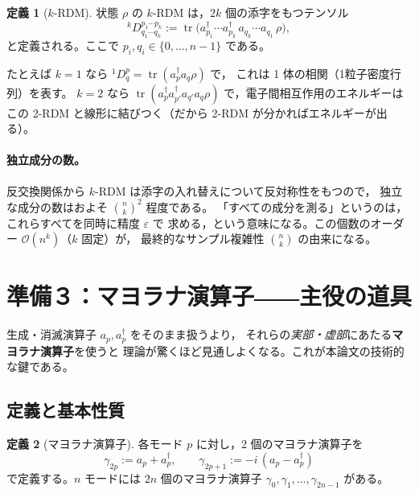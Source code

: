 \documentclass[11pt,a4paper]{ltjsarticle}
\newcommand{\tr}{\operatorname{tr}}
\newcommand{\ad}{a^\dagger}
\theoremstyle{definition}
\newtheorem{teigi}{定義}[section]
\theoremstyle{plain}
\begin{document}
\begin{teigi}[$k$-RDM]
状態 $\rho$ の $k$-RDM は，$2k$ 個の添字をもつテンソル
\begin{equation}
  {}^{k}D^{p_1\cdots p_k}_{q_1\cdots q_k}
  :=\tr\!\bigl(\ad_{p_1}\cdots\ad_{p_k}\,a_{q_k}\cdots a_{q_1}\,\rho\bigr),
  \label{eq:kRDM}
\end{equation}
と定義される。ここで $p_i,q_i\in\{0,\dots,n-1\}$ である。
\end{teigi}

\noindent
たとえば $k=1$ なら ${}^{1}D^{p}_{q}=\tr(\ad_p a_q\rho)$ で，
これは 1 体の相関（1粒子密度行列）を表す。
$k=2$ なら $\tr(\ad_p\ad_{p'}a_{q'}a_q\rho)$ で，電子間相互作用のエネルギーは
この 2-RDM と線形に結びつく（だから 2-RDM が分かればエネルギーが出る）。

\paragraph{独立成分の数。}
反交換関係から $k$-RDM は添字の入れ替えについて反対称性をもつので，
独立な成分の数はおよそ $\binom{n}{k}^2$ 程度である。
「すべての成分を測る」というのは，これらすべてを同時に精度 $\varepsilon$ で
求める，という意味になる。この個数のオーダー $\mathcal O(n^k)$（$k$ 固定）が，
最終的なサンプル複雑性 $\binom{n}{k}$ の由来になる。

\section{準備３：マヨラナ演算子――主役の道具}\label{sec:majorana}

生成・消滅演算子 $a_p,\ad_p$ をそのまま扱うより，
それらの\emph{実部・虚部}にあたる\textbf{マヨラナ演算子}を使うと
理論が驚くほど見通しよくなる。これが本論文の技術的な鍵である。

\subsection{定義と基本性質}
\begin{teigi}[マヨラナ演算子]
各モード $p$ に対し，2 個のマヨラナ演算子を
\begin{equation}
  \gamma_{2p}:=a_p+\ad_p,\qquad
  \gamma_{2p+1}:=-i\,(a_p-\ad_p)
  \label{eq:majdef}
\end{equation}
で定義する。$n$ モードには $2n$ 個のマヨラナ演算子
$\gamma_0,\gamma_1,\dots,\gamma_{2n-1}$ がある。
\end{teigi}
\end{document}
